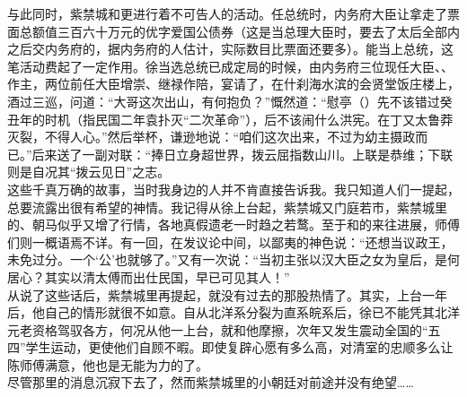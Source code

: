 与此同时，紫禁城和更进行着不可告人的活动。任总统时，内务府大臣让拿走了票面总额值三百六十万元的优字爱国公债券（这是当总理大臣时，要去了太后全部内之后交内务府的，据内务府的人估计，实际数目比票面还要多）。能当上总统，这笔活动费起了一定作用。徐当选总统已成定局的时候，由内务府三位现任大臣、、作主，两位前任大臣增崇、继禄作陪，宴请了，在什刹海水滨的会贤堂饭庄楼上，酒过三巡，问道：“大哥这次出山，有何抱负？”慨然道：“慰亭（）先不该错过癸丑年的时机（指民国二年袁扑灭“二次革命”），后不该闹什么洪宪。在丁又太鲁莽灭裂，不得人心。”然后举杯，谦逊地说：“咱们这次出来，不过为幼主摄政而已。”后来送了一副对联：“捧日立身超世界，拨云屈指数山川。上联是恭维；下联则是自况其“拨云见日”之志。\\

这些千真万确的故事，当时我身边的人并不肯直接告诉我。我只知道人们一提起，总要流露出很有希望的神情。我记得从徐上台起，紫禁城又门庭若市，紫禁城里的、朝马似乎又增了行情，各地真假遗老一时趋之若鹜。至于和的来往进展，师傅们则一概语焉不详。有一回，在发议论中间，以鄙夷的神色说：“还想当议政王，未免过分。一个‘公’也就够了。”又有一次说：“当初主张以汉大臣之女为皇后，是何居心？其实以清太傅而出仕民国，早已可见其人！”\\

从说了这些话后，紫禁城里再提起，就没有过去的那股热情了。其实，上台一年后，他自己的情形就很不如意。自从北洋系分裂为直系皖系后，徐已不能凭其北洋元老资格驾驭各方，何况从他一上台，就和他摩擦，次年又发生震动全国的“五四”学生运动，更使他们自顾不暇。即使复辟心愿有多么高，对清室的忠顺多么让陈师傅满意，他也是无能为力的了。\\

尽管那里的消息沉寂下去了，然而紫禁城里的小朝廷对前途并没有绝望……
